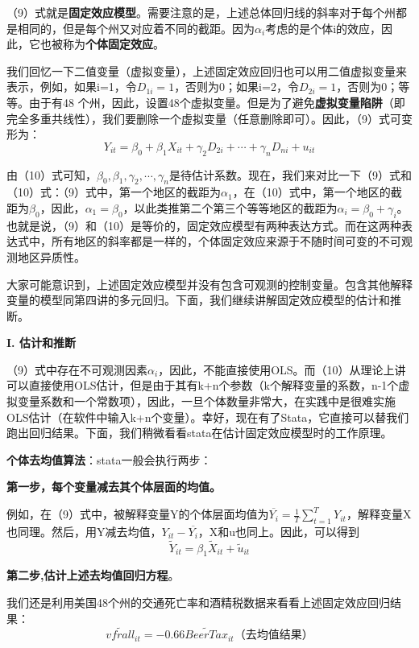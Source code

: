 \documentclass[cn,12pt,math=newtx,citestyle=gb7714-2015,bibstyle=gb7714-2015]{elegantbook}
\begin{document}
（9）式就是\textbf{固定效应模型}。需要注意的是，上述总体回归线的斜率对于每个州都是相同的，但是每个州又对应着不同的截距。因为$\alpha_i$考虑的是个体i的效应，因此，它也被称为\textbf{个体固定效应}。

我们回忆一下二值变量（虚拟变量），上述固定效应回归也可以用二值虚拟变量来表示，例如，如果i=1，令$D_{1i}=1$，否则为0；如果i=2，令$D_{2i}=1$，否则为0；等等。由于有48 个州，因此，设置48个虚拟变量。但是为了避免\textbf{虚拟变量陷阱}（即完全多重共线性），我们要删除一个虚拟变量（任意删除即可）。因此，（9）式可变形为：
\begin{equation}
	Y_{it}=\beta_{0}+\beta_{1}X_{it}+\gamma_2D_{2i}+\cdots+\gamma_nD_{ni}+u_{it}
\end{equation}

由（10）式可知，$\beta_0,\beta_1,\gamma_2,\cdots,\gamma_n$是待估计系数。现在，我们来对比一下（9）式和（10）式：（9）式中，第一个地区的截距为$\alpha_1$，在（10）式中，第一个地区的截距为$\beta_{0}$，因此，$\alpha_1=\beta_{0}$，以此类推第二个第三个等等地区的截距为$\alpha_i=\beta_0+\gamma_i$。也就是说，（9）和（10）是等价的，固定效应模型有两种表达方式。而在这两种表达式中，所有地区的斜率都是一样的，个体固定效应来源于不随时间可变的不可观测地区异质性。

大家可能意识到，上述固定效应模型并没有包含可观测的控制变量。包含其他解释变量的模型同第四讲的多元回归。下面，我们继续讲解固定效应模型的估计和推断。

\textbf{I. 估计和推断}

（9）式中存在不可观测因素$\alpha_i$，因此，不能直接使用OLS。而（10）从理论上讲可以直接使用OLS估计，但是由于其有k+n个参数（k个解释变量的系数，n-1个虚拟变量系数和一个常数项），因此，一旦个体数量非常大，在实践中是很难实施OLS估计（在软件中输入k+n个变量）。幸好，现在有了Stata，它直接可以替我们跑出回归结果。下面，我们稍微看看stata在估计固定效应模型时的工作原理。

\textbf{个体去均值算法}：stata一般会执行两步：

\textbf{第一步，每个变量减去其个体层面的均值。}

例如，在（9）式中，被解释变量Y的个体层面均值为$\overline{Y_i}=\frac{1}{T}\sum_{t=1}^{T}Y_{it}$，解释变量X也同理。然后，用Y减去均值，$Y_{it}-\overline{Y_i}$，X和u也同上。因此，可以得到
\begin{equation}
	\tilde{Y}_{it}=\beta_{1}\tilde{X}_{it}+\tilde{u}_{it}
\end{equation}

\textbf{第二步,估计上述去均值回归方程}。

我们还是利用美国48个州的交通死亡率和酒精税数据来看看上述固定效应回归结果：
\begin{equation}
	\tilde{vfrall}_{it}=-0.66\tilde{BeerTax}_{it}（去均值结果）
\end{equation}
\end{document}
